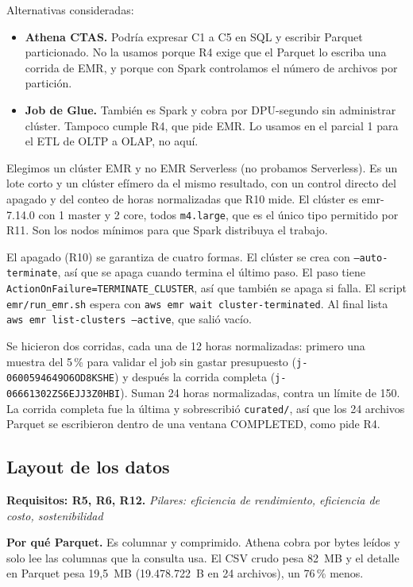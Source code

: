 \documentclass[11pt,letterpaper]{article}
\newcommand{\trazo}[2]{\par\smallskip\noindent\textbf{#1.} \textit{#2}\par\smallskip}
\begin{document}
Alternativas consideradas:
\begin{itemize}
  \item \textbf{Athena CTAS.} Podría expresar C1 a C5 en SQL y escribir Parquet particionado. No la usamos porque R4 exige que el Parquet lo escriba una corrida de EMR, y porque con Spark controlamos el número de archivos por partición.
  \item \textbf{Job de Glue.} También es Spark y cobra por DPU-segundo sin administrar clúster. Tampoco cumple R4, que pide EMR. Lo usamos en el parcial 1 para el ETL de OLTP a OLAP, no aquí.
\end{itemize}

Elegimos un clúster EMR y no EMR Serverless (no probamos Serverless). Es un lote corto y un clúster efímero da el mismo resultado, con un control directo del apagado y del conteo de horas normalizadas que R10 mide. El clúster es emr-7.14.0 con 1 master y 2 core, todos \texttt{m4.large}, que es el único tipo permitido por R11. Son los nodos mínimos para que Spark distribuya el trabajo.

El apagado (R10) se garantiza de cuatro formas. El clúster se crea con \texttt{--auto-terminate}, así que se apaga cuando termina el último paso. El paso tiene \texttt{ActionOnFailure=TERMINATE\_CLUSTER}, así que también se apaga si falla. El script \texttt{emr/run\_emr.sh} espera con \texttt{aws emr wait cluster-terminated}. Al final lista \texttt{aws emr list-clusters --active}, que salió vacío.

Se hicieron dos corridas, cada una de 12 horas normalizadas: primero una muestra del 5\,\% para validar el job sin gastar presupuesto (\texttt{j-0600594649\allowbreak O6OD8KSHE}) y después la corrida completa (\texttt{j-06661302ZS6EJJ3Z\allowbreak 0HBI}). Suman 24 horas normalizadas, contra un límite de 150. La corrida completa fue la última y sobrescribió \texttt{curated/}, así que los 24 archivos Parquet se escribieron dentro de una ventana COMPLETED, como pide R4.

\subsection{Layout de los datos}
\trazo{Requisitos: R5, R6, R12}{Pilares: eficiencia de rendimiento, eficiencia de costo, sostenibilidad}
\textbf{Por qué Parquet.} Es columnar y comprimido. Athena cobra por bytes leídos y solo lee las columnas que la consulta usa. El CSV crudo pesa 82~MB y el detalle en Parquet pesa 19,5~MB (19.478.722~B en 24 archivos), un 76\,\% menos.
\end{document}
